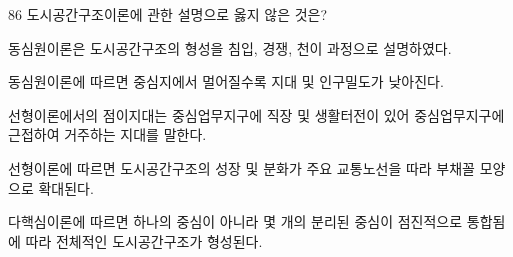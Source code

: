 \begin{question}{86}
도시공간구조이론에 관한 설명으로 옳지 않은 것은?
\begin{choices}
  \item 동심원이론은 도시공간구조의 형성을 침입, 경쟁, 천이 과정으로 설명하였다.
  \item 동심원이론에 따르면 중심지에서 멀어질수록 지대 및 인구밀도가 낮아진다.
  \item 선형이론에서의 점이지대는 중심업무지구에 직장 및 생활터전이 있어 중심업무지구에 근접하여 거주하는 지대를 말한다.
  \item 선형이론에 따르면 도시공간구조의 성장 및 분화가 주요 교통노선을 따라 부채꼴 모양으로 확대된다.
  \item 다핵심이론에 따르면 하나의 중심이 아니라 몇 개의 분리된 중심이 점진적으로 통합됨에 따라 전체적인 도시공간구조가 형성된다.
\end{choices}
\end{question}
